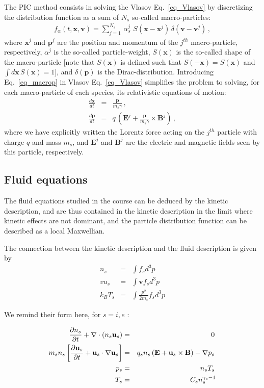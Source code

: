 \documentclass[11pt,a4paper]{article}
\newcommand{\vE}{\mathbf{E}}
\newcommand{\vB}{\mathbf{B}}
\newcommand{\vx}{\mathbf{x}}
\newcommand{\vp}{\mathbf{p}}
\newcommand{\vv}{\mathbf{v}}
\newcommand{\vu}{\mathbf{u}}
\begin{document}
The PIC method consists in solving the Vlasov Eq.~\eqref{eq_Vlasov} by discretizing the distribution function as a sum of $N_s$ so-called macro-particles:
\begin{eqnarray}\label{eq_macrop}
f_\alpha (t,\vx,\vv) = \sum_{j=1}^{N_s}\,\alpha_s^j\,\,S(\vx-\vx^j)\,\delta(\vv-\vv^j)\,,
\end{eqnarray}
where $\vx^j$ and $\vp^j$ are the position and momentum of the $j^{th}$ macro-particle, respectively, $\alpha^j$ is the so-called particle-weight, $S(\vx)$ is the so-called shape of the macro-particle [note that $S(\vx)$ is defined such that $S(-\vx)=S(\vx)$ and $\int d\vx\,S(\vx)=1$], and $\delta(\vp)$ is the Dirac-distribution. Introducing Eq.~\eqref{eq_macrop} in Vlasov Eq.~\eqref{eq_Vlasov} simplifies the problem to solving, for each macro-particle of each species, its relativistic equations of motion:
\begin{eqnarray*}
\frac{d\vx}{dt}  &=& \frac{\vp}{m_s \gamma}\,,\\
\frac{d\vp}{dt}  &=&  q\,\left( \vE^j + \frac{\vp}{m_s \gamma} \times \vB^j \right)\,,
\end{eqnarray*}
where we have explicitly written the Lorentz force acting on the $j^{th}$ particle with charge $q$ and mass $m_s$, and $\vE^j$ and $\vB^j$ are the electric and magnetic fields seen by this particle, respectively.

\subsection*{Fluid equations}

The fluid equations studied in the course can be deduced by the kinetic description, and are thus contained in the kinetic description 
in the limit where kinetic effects are not dominant, and the particle distribution function can be described as a local Maxwellian. 

The connection between the kinetic description and the fluid description is given by 
\begin{eqnarray*}
n_s &=& \int f_s d^3p \\
vu_s &=&\int \vv f_s d^3p \\
k_B T_s &=&\int \frac{p^2}{2m_s}  f_s d^3p
\end{eqnarray*}

We remind their form here, for  $s=i,e$ :

\begin{eqnarray*}
\frac{\partial  n_s}{\partial t}+
 {\bf{\nabla}} \cdot (n_s \vu_s)  &=&  0\, \\
m_s n_s \left[\frac{\partial \vu_s}{\partial t}+\vu_s \cdot {\bf{\nabla}} \vu_s
\right] &=& q_s n_s \left( \vE + \vu_s \times \vB \right) - {\bf{\nabla}} p_s \,  \\
p_s &=& n_s T_s \, \\  
T_s &=& C_s n_s^{\gamma_s-1}
\end{eqnarray*}
\end{document}

